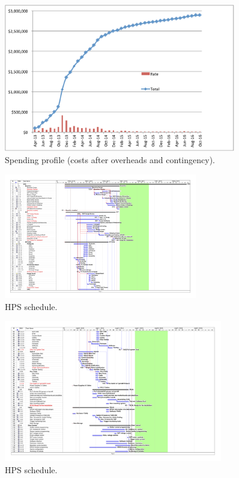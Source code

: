 \begin{figure}[ht]
\centering
\includegraphics[width=0.9\textwidth]{cost_schedule/spending} 
\caption{Spending profile (costs after overheads and contingency).}
\label{fig:spending}
\end{figure}

\begin{figure}[ht]
\centering
\includegraphics*[angle=90,width=0.75\textwidth]{cost_schedule/ScheduleHPSV470-1.jpg} 
\caption{HPS schedule.}
\label{fig:schedulea}
\end{figure}
\begin{figure}[ht]
\centering
\includegraphics*[angle=90,width=0.85\textwidth]{cost_schedule/ScheduleHPSV470-2.jpg} 
\caption{HPS schedule.}
\label{fig:scheduleb}
\end{figure}

